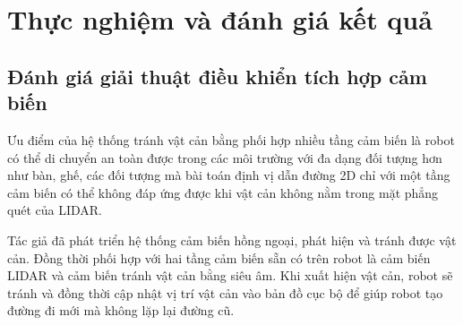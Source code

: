 {%
\section{Thực nghiệm và đánh giá kết quả}
\label{sec:testbed}





\subsection{Đánh giá giải thuật điều khiển tích hợp cảm biến}

Ưu điểm của hệ thống tránh vật cản bằng phối hợp nhiều tầng cảm biến là robot có thể di chuyển an toàn được trong các môi trường với đa dạng đối tượng hơn như bàn, ghế, các đối tượng mà bài toán định vị dẫn đường 2D chỉ với một tầng cảm biến có thể không đáp ứng được khi vật cản không nằm trong mặt phẳng quét của LIDAR.

Tác giả đã phát triển hệ thống cảm biến hồng ngoại, phát hiện và tránh được vật cản. Đồng thời phối hợp với hai tầng cảm biến sẵn có trên robot là cảm biến LIDAR và cảm biến tránh vật cản bằng siêu âm. Khi xuất hiện vật cản, robot sẽ tránh và đồng thời cập nhật vị trí vật cản vào bản đồ cục bộ để giúp robot tạo đường đi mới mà không lặp lại đường cũ.

}

